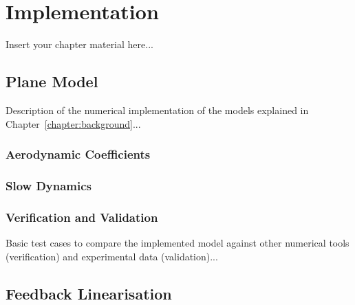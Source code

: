 
\chapter{Implementation}
\label{chapter:implementation}

Insert your chapter material here...

\section{Plane Model}
\label{section:model}

Description of the numerical implementation of the models explained in Chapter~\ref{chapter:background}...
\subsection{Aerodynamic Coefficients}
\label{section:model/aero_coef}

\subsection{Slow Dynamics}
\label{section:model/slow_dynamics}

\subsection{Verification and Validation}
\label{section:model/verification}

Basic test cases to compare the implemented model against other numerical tools (verification) and experimental data (validation)...

\section{Feedback Linearisation}
\label{section:FBL}

